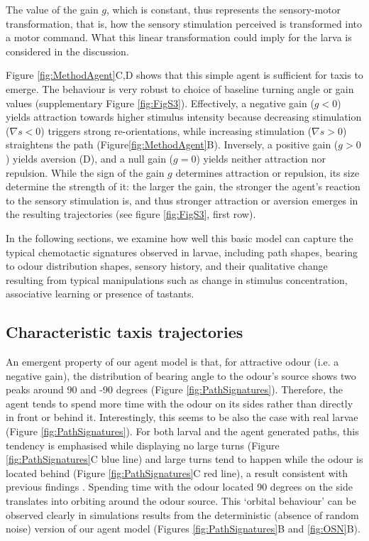 \documentclass[11pt,a4paper]{article}
\newcommand{\todoML}[1]{\todo[author=ML,color=white, size=\tiny,inline]{#1}}
\begin{document}
The value of the gain $g$, which is constant, thus represents the sensory-motor transformation, that is, how the sensory stimulation perceived is transformed into a motor command. What this linear transformation could imply for the larva is considered in the discussion. 

Figure \ref{fig:MethodAgent}C,D shows that this simple agent is sufficient for taxis to emerge. The behaviour is very robust to choice of baseline turning angle or gain values (supplementary Figure \ref{fig:FigS3}). Effectively, a negative gain ($g<0$) yields attraction towards higher stimulus intensity because decreasing stimulation ($\nabla s<0$) triggers strong re-orientations, while increasing stimulation ($\nabla s>0$) straightens the path (Figure\ref{fig:MethodAgent}B). Inversely, a positive gain ($g>0$) yields aversion (D), and a null gain ($g=0$) yields neither attraction nor repulsion. While the sign of the gain $g$ determines attraction or repulsion, its size determine the strength of it: the larger the gain, the stronger the agent's reaction to the sensory stimulation is, and thus stronger attraction or aversion emerges in the resulting trajectories (see figure \ref{fig:FigS3}, first row).

In the following sections, we examine how well this basic model can capture the typical chemotactic signatures observed in larvae, including path shapes, bearing to odour distribution shapes, sensory history, and their qualitative change resulting from typical manipulations such as change in stimulus concentration, associative learning or presence of tastants. 

\subsection{Characteristic taxis trajectories}
An emergent property of our agent model is that, for attractive odour (i.e. a negative gain), the distribution of bearing angle to the odour's source shows two peaks around 90 and -90 degrees (Figure \ref{fig:PathSignatures}). Therefore, the agent tends to spend more time with the odour on its sides rather than directly in front or behind it. Interestingly, this seems to be also the case with real larvae (Figure \ref{fig:PathSignatures}).
 For both larval and the agent generated paths, this tendency is emphasised while displaying no large turns (Figure \ref{fig:PathSignatures}C blue line) and large turns tend to happen while the odour is located behind (Figure \ref{fig:PathSignatures}C red line), a result consistent with previous findings \cite{gomez2011active,schleyer2015impact}.
 Spending time with the odour located 90 degrees on the side translates into orbiting around the odour source. This ‘orbital behaviour’ can be observed clearly in simulations results from the deterministic (absence of random noise) version of our agent model (Figures \ref{fig:PathSignatures}B and \ref{fig:OSN}B).
\end{document}
